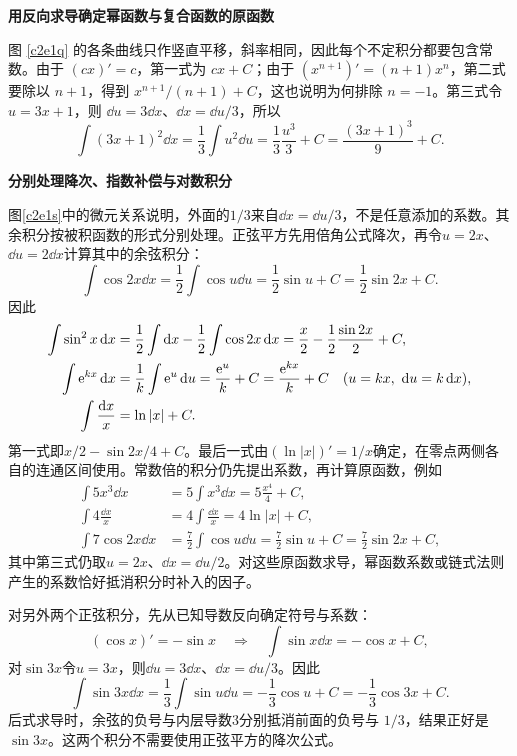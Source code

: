 \begin{solution}\textbf{用反向求导确定幂函数与复合函数的原函数}\par\nobreak
图 \ref{c2e1q} 的各条曲线只作竖直平移，斜率相同，因此每个不定积分都要包含常数。由于 $(cx)'=c$，第一式为 $cx+C$；由于 $(x^{n+1})'=(n+1)x^n$，第二式要除以 $n+1$，得到 $x^{n+1}/(n+1)+C$，这也说明为何排除 $n=-1$。第三式令 $u=3x+1$，则 $\dd u=3\dd x$、$\dd x=\dd u/3$，所以
\[
 \int(3x+1)^2\dd x
 =\frac13\int u^2\dd u
 =\frac13\frac{u^3}{3}+C
 =\frac{(3x+1)^3}{9}+C.
\]



\par\medskip{}\noindent\textbf{分别处理降次、指数补偿与对数积分}\par\nobreak
图\ref{c2e1s}中的微元关系说明，外面的$1/3$来自$\dd x=\dd u/3$，不是任意添加的系数。其余积分按被积函数的形式分别处理。正弦平方先用倍角公式降次，再令$u=2x$、$\dd u=2\dd x$计算其中的余弦积分：
\[
\int\cos2x\dd x=\frac12\int\cos u\dd u
=\frac12\sin u+C=\frac12\sin2x+C.
\]
因此
\[
 \begin{aligned}
 \int\sin^2x\dd x
 &=\frac12\int\dd x-\frac12\int\cos2x\dd x
 =\frac x2-\frac12\frac{\sin2x}{2}+C,\\
 \int\e^{kx}\dd x&=\frac1k\int\e^u\dd u
 =\frac{\e^u}k+C=\frac{\e^{kx}}k+C
 \quad(u=kx,\ \dd u=k\dd x),\\
 \int\frac{\dd x}x&=\ln|x|+C.
 \end{aligned}
\]
第一式即$x/2-\sin2x/4+C$。最后一式由$(\ln|x|)'=1/x$确定，在零点两侧各自的连通区间使用。常数倍的积分仍先提出系数，再计算原函数，例如
\begin{align*}
\int5x^3\dd x&=5\int x^3\dd x=5\frac{x^4}{4}+C,\\
\int4\frac{\dd x}{x}&=4\int\frac{\dd x}{x}=4\ln|x|+C,\\
\int7\cos2x\dd x&=\frac72\int\cos u\dd u
=\frac72\sin u+C=\frac72\sin2x+C,
\end{align*}
其中第三式仍取$u=2x$、$\dd x=\dd u/2$。对这些原函数求导，幂函数系数或链式法则产生的系数恰好抵消积分时补入的因子。

对另外两个正弦积分，先从已知导数反向确定符号与系数：
\[(\cos x)'=-\sin x\quad\Longrightarrow\quad
\int\sin x\dd x=-\cos x+C,\]
对$\sin3x$令$u=3x$，则$\dd u=3\dd x$、$\dd x=\dd u/3$。因此
\[\int\sin3x\dd x
 =\frac13\int\sin u\dd u
 =-\frac13\cos u+C=-\frac13\cos3x+C
 .\]
后式求导时，余弦的负号与内层导数3分别抵消前面的负号与 $1/3$，结果正好是 $\sin3x$。这两个积分不需要使用正弦平方的降次公式。
\end{solution}


